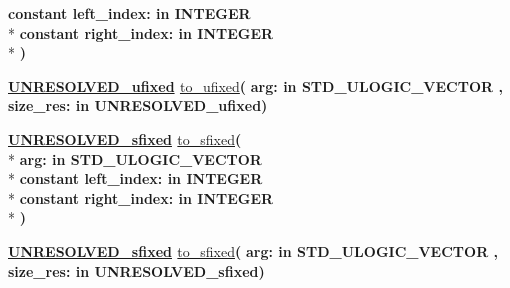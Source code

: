 \begin{DoxyCompactItemize}
{\bfseries {\bfseries \textcolor{keywordflow}{constant}\textcolor{vhdlchar}{ }}\textcolor{vhdlchar}{left\+\_\+index\+: }\textcolor{stringliteral}{in }{\bfseries \textcolor{comment}{I\+N\+T\+E\+G\+E\+R}\textcolor{vhdlchar}{ }}}\\*
{\bfseries {\bfseries \textcolor{keywordflow}{constant}\textcolor{vhdlchar}{ }}\textcolor{vhdlchar}{right\+\_\+index\+: }\textcolor{stringliteral}{in }{\bfseries \textcolor{comment}{I\+N\+T\+E\+G\+E\+R}\textcolor{vhdlchar}{ }}}\\*
{\bfseries  )} 
\item 
{\bfseries {\bfseries {\bfseries \hyperlink{classfixed__pkg_ae78bc2b36d22f6abeac163955e8a587d}{U\+N\+R\+E\+S\+O\+L\+V\+E\+D\+\_\+ufixed}} \textcolor{vhdlchar}{ }}} \hyperlink{classfixed__pkg_af26dc87215f262aaa602a93f0fc9c123}{to\+\_\+ufixed}{\bfseries  ( }{\bfseries \textcolor{vhdlchar}{arg\+: }\textcolor{stringliteral}{in }{\bfseries \textcolor{comment}{S\+T\+D\+\_\+\+U\+L\+O\+G\+I\+C\+\_\+\+V\+E\+C\+T\+O\+R}\textcolor{vhdlchar}{ }}}{\bfseries  , \textcolor{vhdlchar}{size\+\_\+res\+: }\textcolor{stringliteral}{in }\textcolor{vhdlchar}{U\+N\+R\+E\+S\+O\+L\+V\+E\+D\+\_\+ufixed}}{\bfseries  )} 
\item 
{\bfseries {\bfseries {\bfseries \hyperlink{classfixed__pkg_aa723b28a027c3c0f9bca02d75e8df4d6}{U\+N\+R\+E\+S\+O\+L\+V\+E\+D\+\_\+sfixed}} \textcolor{vhdlchar}{ }}} \hyperlink{classfixed__pkg_af46256039c7dcae5645c9522a0d7a78f}{to\+\_\+sfixed}{\bfseries  ( }\\*
{\bfseries \textcolor{vhdlchar}{arg\+: }\textcolor{stringliteral}{in }{\bfseries \textcolor{comment}{S\+T\+D\+\_\+\+U\+L\+O\+G\+I\+C\+\_\+\+V\+E\+C\+T\+O\+R}\textcolor{vhdlchar}{ }}}\\*
{\bfseries {\bfseries \textcolor{keywordflow}{constant}\textcolor{vhdlchar}{ }}\textcolor{vhdlchar}{left\+\_\+index\+: }\textcolor{stringliteral}{in }{\bfseries \textcolor{comment}{I\+N\+T\+E\+G\+E\+R}\textcolor{vhdlchar}{ }}}\\*
{\bfseries {\bfseries \textcolor{keywordflow}{constant}\textcolor{vhdlchar}{ }}\textcolor{vhdlchar}{right\+\_\+index\+: }\textcolor{stringliteral}{in }{\bfseries \textcolor{comment}{I\+N\+T\+E\+G\+E\+R}\textcolor{vhdlchar}{ }}}\\*
{\bfseries  )} 
\item 
{\bfseries {\bfseries {\bfseries \hyperlink{classfixed__pkg_aa723b28a027c3c0f9bca02d75e8df4d6}{U\+N\+R\+E\+S\+O\+L\+V\+E\+D\+\_\+sfixed}} \textcolor{vhdlchar}{ }}} \hyperlink{classfixed__pkg_acef6c4472059ccc60871f4189787d202}{to\+\_\+sfixed}{\bfseries  ( }{\bfseries \textcolor{vhdlchar}{arg\+: }\textcolor{stringliteral}{in }{\bfseries \textcolor{comment}{S\+T\+D\+\_\+\+U\+L\+O\+G\+I\+C\+\_\+\+V\+E\+C\+T\+O\+R}\textcolor{vhdlchar}{ }}}{\bfseries  , \textcolor{vhdlchar}{size\+\_\+res\+: }\textcolor{stringliteral}{in }\textcolor{vhdlchar}{U\+N\+R\+E\+S\+O\+L\+V\+E\+D\+\_\+sfixed}}{\bfseries  )} 

\end{DoxyCompactItemize}
